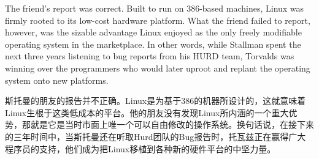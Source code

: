 \ifdefined\eng
The friend's report was correct. Built to run on 386-based machines, Linux was firmly rooted to its low-cost hardware platform. What the friend failed to report, however, was the sizable advantage Linux enjoyed as the only freely modifiable operating system in the marketplace. In other words, while Stallman spent the next three years listening to bug reports from his HURD team, Torvalds was winning over the programmers who would later uproot and replant the operating system onto new platforms.
\fi

\ifdefined\chs
斯托曼的朋友的报告并不正确。Linux是为基于386的机器所设计的，这就意味着Linux生根于这类低成本的平台。他的朋友没有发现Linux所内涵的一个重大优势，那就是它是当时市面上唯一个可以自由修改的操作系统。换句话说，在接下来的三年时间中，当斯托曼还在听取Hurd团队的Bug报告时，托瓦兹正在赢得广大程序员的支持，他们成为把Linux移植到各种新的硬件平台的中坚力量。
\fi



